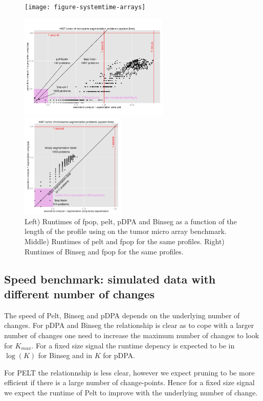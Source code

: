 \documentclass{article}
\begin{document}
\begin{figure}\label{fig:sys_runtimes_microarray}
 \parbox{6.5cm}{ \texttt{[image: figure-systemtime-arrays]}
  } \parbox{6.5cm}{  \includegraphics[height=5cm]{figure-systemtime-arrays-fpop-pelt}}
 \parbox{6cm}{ \includegraphics[height=5cm]{figure-systemtime-arrays-fpop-multiBinSeg}}
 

\caption{Left) Runtimes of fpop, pelt,
pDPA and Binseg as a function of the length of the profile  using  on the tumor micro array benchmark. 
Middle) Runtimes of pelt and fpop for the same profiles.
Right) Runtimes of Binseg and fpop for the same profiles.
}
\end{figure}





\subsection{Speed benchmark: simulated data with different 
  number of changes}

The speed of Pelt, Binseg and pDPA depends on the underlying number of changes.
For pDPA and Binseg the relationship is clear as to cope with a larger number of changes
one need to increase the maximum number of changes to look for $K_{max}$. 
For a fixed size signal the runtime depency is expected to be in $\log(K)$ for Binseg and
in $K$ for pDPA.

For PELT the relationnship is less clear, however we expect pruning to be more efficient
if there is a large number of change-points. Hence for a fixed size signal we expect 
the runtime of Pelt to improve with the underlying number of change.
\end{document}
